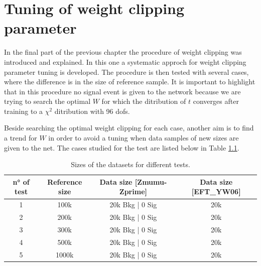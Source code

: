 \chapter{Tuning of weight clipping parameter}
\label{chap:W_CLIP}





In the final part of the previous chapter the procedure of weight clipping was introduced and explained. In this one a systematic approch for weight clipping parameter tuning is developed. The procedure is then tested with several cases, where the difference is in the size of reference sample. It is important to highlight that in this procedure no signal event is given to the network because we are trying to search the optimal $W$ for which the ditribution of $t$ converges after training to a $\chi^2$ ditribution with 96 dofs.

Beside searching the optimal weight clipping for each case, another aim is to find a trend for $W$ in order to avoid a tuning when data samples of new sizes are given to the net. The cases studied for the test are listed below in Table \ref{tab:W_CLIP_TEST_SIZES}.

\begin{table}[H]
	\centering
	\begin{tabular}{c c c c}
		\toprule
		n° of test	&	Reference size	&	Data size [\textbf{Zmumu-Zprime}]	&	Data size [\textbf{EFT\_YW06}]	\\
		\midrule
		1			&	100k			&	20k Bkg | 0 Sig				&	20k			\\
		2			&	200k			&	20k Bkg | 0 Sig				&	20k			\\
		3			&	300k			&	20k Bkg | 0 Sig				&	20k			\\
		4			&	500k			&	20k Bkg | 0 Sig				&	20k			\\
		5			&	1000k			&	20k Bkg | 0 Sig				&	20k			\\
		\bottomrule
	\end{tabular}
	\caption{Sizes of the datasets for different tests.}
	\label{tab:W_CLIP_TEST_SIZES}
\end{table}





